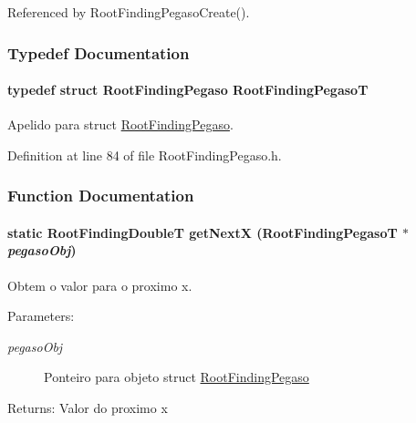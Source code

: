 Referenced by RootFindingPegasoCreate().

\subsubsection{Typedef Documentation}
\hypertarget{group____pegaso_gd48e82d0f19968cca8a006303b6775ee}{
\paragraph[RootFindingPegasoT]{\setlength{\rightskip}{0pt plus 5cm}typedef struct {\bf RootFindingPegaso} {\bf RootFindingPegasoT}}\hfill}
\label{group____pegaso_gd48e82d0f19968cca8a006303b6775ee}


Apelido para struct \hyperlink{structRootFindingPegaso}{RootFindingPegaso}. 



Definition at line 84 of file RootFindingPegaso.h.

\subsubsection{Function Documentation}
\hypertarget{group____pegaso_gc404fd69441e2b99f44b18fe14d4fc48}{
\paragraph[getNextX]{\setlength{\rightskip}{0pt plus 5cm}static {\bf RootFindingDoubleT} getNextX ({\bf RootFindingPegasoT} $\ast$ {\em pegasoObj})}\hfill}
\label{group____pegaso_gc404fd69441e2b99f44b18fe14d4fc48}


Obtem o valor para o proximo x. 

\begin{Desc}
\item[Parameters:]
\begin{description}
\item[{\em pegasoObj}]Ponteiro para objeto struct \hyperlink{structRootFindingPegaso}{RootFindingPegaso} \end{description}
\end{Desc}
\begin{Desc}
\item[Returns:]Valor do proximo x \end{Desc}


